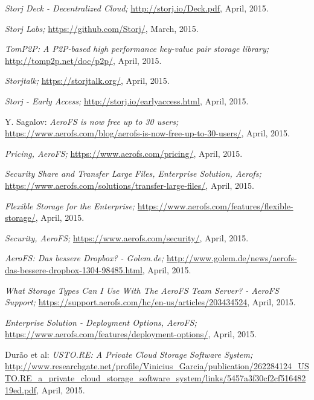 \begin{thebibliography}{99}
		\emph{Storj Deck - Decentralized Cloud;}
		\url{http://storj.io/Deck.pdf},
		April, 2015.

		\emph{Storj Labs;}
		\url{https://github.com/Storj/},
		March, 2015.
		
		\emph{TomP2P: A P2P-based high performance key-value pair storage library;}
		\url{http://tomp2p.net/doc/p2p/},
		April, 2015.
		
		\emph{Storjtalk;}
		\url{https://storjtalk.org/},
		April, 2015.
		
		\emph{Storj - Early Access;}
		\url{http://storj.io/earlyaccess.html},
		April, 2015.
		
		Y. Sagalov:
		\emph{AeroFS is now free up to 30 users;}
		\url{https://www.aerofs.com/blog/aerofs-is-now-free-up-to-30-users/},
		April, 2015.
		
		\emph{Pricing, AeroFS;}
		\url{https://www.aerofs.com/pricing/},
		April, 2015.
		
		\emph{Security Share and Transfer Large Files, Enterprise Solution, Aerofs;}
		\url{https://www.aerofs.com/solutions/transfer-large-files/},
		April, 2015.
		
		\emph{Flexible Storage for the Enterprise;}
		\url{https://www.aerofs.com/features/flexible-storage/},
		April, 2015.
		
		\emph{Security, AeroFS;}
		\url{https://www.aerofs.com/security/},
		April, 2015.
		
		\emph{AeroFS: Das bessere Dropbox? - Golem.de;}
		\url{http://www.golem.de/news/aerofs-das-bessere-dropbox-1304-98485.html},
		April, 2015.
		
		\emph{What Storage Types Can I Use With The AeroFS Team Server? - AeroFS Support;}
		\url{https://support.aerofs.com/hc/en-us/articles/203434524},
		April, 2015.
		
		\emph{Enterprise Solution - Deployment Options, AeroFS;}
		\url{https://www.aerofs.com/features/deployment-options/},
		April, 2015.
		
		Dur\~ao et al:
		\emph{USTO.RE: A Private Cloud Storage Software System;}
		\url{http://www.researchgate.net/profile/Vinicius_Garcia/publication/262284124_USTO.RE_a_private_cloud_storage_software_system/links/5457a3f30cf2cf51648219ed.pdf},
		April, 2015.
		

\end{thebibliography}
